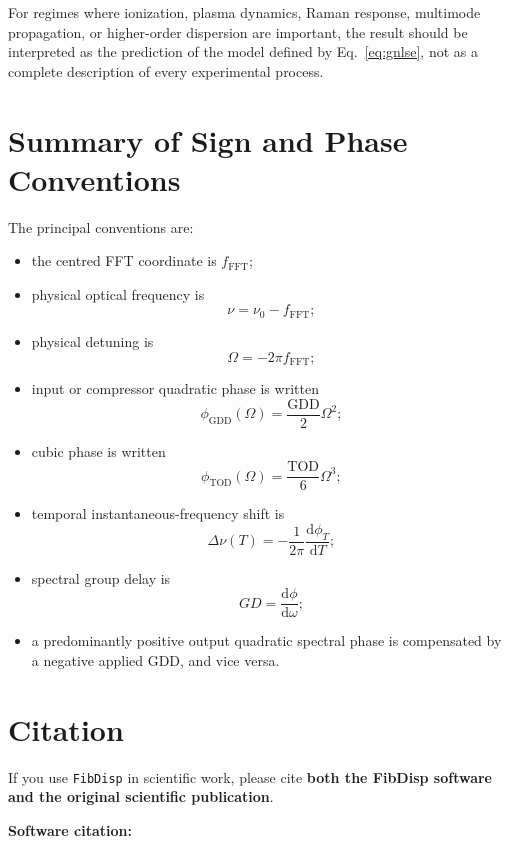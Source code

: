 \documentclass[11pt,a4paper]{article}
\newcommand{\FFT}{\mathrm{FFT}}
\newcommand{\GDD}{\mathrm{GDD}}
\newcommand{\TOD}{\mathrm{TOD}}
\newcommand{\dd}{\mathrm{d}}
\begin{document}
For regimes where ionization, plasma dynamics, Raman response, multimode
propagation, or higher-order dispersion are important, the result should be
interpreted as the prediction of the model defined by Eq.~\eqref{eq:gnlse}, not
as a complete description of every experimental process.

\section{Summary of Sign and Phase Conventions}

The principal conventions are:

\begin{itemize}
    \item the centred FFT coordinate is $f_{\FFT}$;
    \item physical optical frequency is
    \[
    \nu=\nu_0-f_{\FFT};
    \]
    \item physical detuning is
    \[
    \Omega=-2\pi f_{\FFT};
    \]
    \item input or compressor quadratic phase is written
    \[
    \phi_{\GDD}(\Omega)=\frac{\GDD}{2}\Omega^2;
    \]
    \item cubic phase is written
    \[
    \phi_{\TOD}(\Omega)=\frac{\TOD}{6}\Omega^3;
    \]
    \item temporal instantaneous-frequency shift is
    \[
    \Delta\nu(T)
    =-\frac{1}{2\pi}\frac{\dd\phi_T}{\dd T};
    \]
    \item spectral group delay is
    \[
    GD=\frac{\dd\phi}{\dd\omega};
    \]
    \item a predominantly positive output quadratic spectral phase is
    compensated by a negative applied GDD, and vice versa.
\end{itemize}

\section{Citation}

If you use \texttt{FibDisp} in scientific work, please cite \textbf{both the
FibDisp software and the original scientific publication}.

\textbf{Software citation:}
\end{document}

